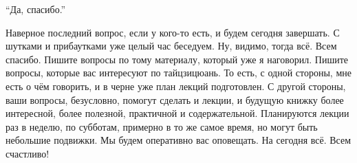 ``Да, спасибо.''

Наверное последний вопрос, если у кого-то есть, и будем 
сегодня завершать. С шутками и прибаутками уже целый час беседуем. Ну, видимо, тогда всё. Всем 
спасибо. Пишите вопросы по тому материалу, который уже я наговорил. Пишите вопросы, которые 
вас интересуют по тайцзицюань. То есть, с одной стороны, мне есть о чём говорить, и в черне уже 
план лекций подготовлен. С другой стороны, ваши вопросы, безусловно, помогут сделать и 
лекции, и будущую книжку более интересной, более полезной, практичной и содержательной. 
Планируются лекции раз в неделю, по субботам, примерно в то же самое время, но могут быть 
небольшие подвижки. Мы будем оперативно вас оповещать. На сегодня всё. Всем счастливо!
\bye

